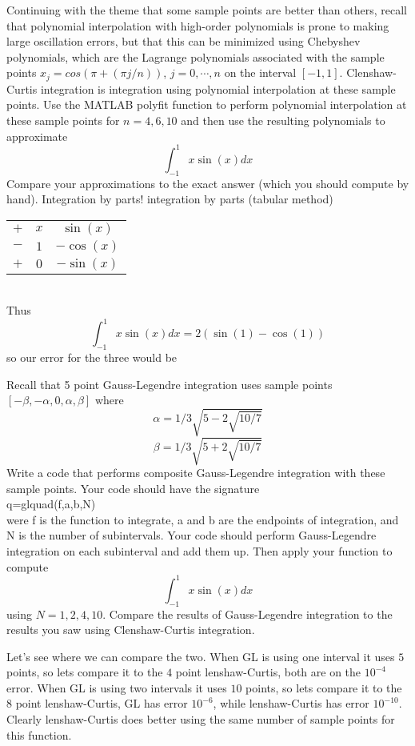 \documentclass[12pt]{article}
\makeatletter
\theoremstyle{homework}
\newenvironment{exercise}[1]
{\def\@currentlabel{#1}\exercisecore}
{\endexercisecore}
\makeatother
\begin{document}
\begin{exercise}
3
Continuing with the theme that some sample points are better than others, recall that
polynomial interpolation with high-order polynomials is prone to making large oscillation
errors, but that this can be minimized using Chebyshev polynomials, which are the
Lagrange polynomials associated with the sample points
$x_j = cos(\pi + (\pi j/n))$, $j = 0, \cdots , n$
on the interval $[-1,1]$. Clenshaw-Curtis integration is integration using polynomial interpolation
at these sample points.
Use the MATLAB polyfit function to perform polynomial interpolation at these sample
points for $n = 4, 6,10$ and then use the resulting polynomials to approximate
$$\int^1_{-1}x \sin(x) dx$$
Compare your approximations to the exact answer (which you should compute by hand).
Integration by parts!
\end{exercise}
integration by parts (tabular method)\\
\begin{tabular}{c c c}
$+$ & $x$ & $\sin(x)$\\
$-$ & $1$ & $-\cos(x)$\\
$+$ & $0$ & $-\sin(x)$\\
\end{tabular}\\
Thus
$$\int^1_{-1}x \sin(x) dx=2(\sin(1)-\cos(1))$$
so our error for the three would be


\begin{exercise}
4
Recall that 5 point Gauss-Legendre integration uses sample points$[-\beta,-\alpha,0,\alpha,\beta]$ where
$$\alpha=1/3\sqrt{5-2\sqrt{10/7}}$$
$$\beta=1/3\sqrt{5+2\sqrt{10/7}}$$
Write a code that performs composite Gauss-Legendre integration with these sample
points. Your code should have the signature\\
q=glquad(f,a,b,N)\\
were f is the function to integrate, a and b are the endpoints of integration, and N is the
number of subintervals. Your code should perform Gauss-Legendre integration on each
subinterval and add them up. Then apply your function to compute
$$\int^1_{-1}x \sin(x) dx$$
using $N = 1, 2, 4,10$. Compare the results of Gauss-Legendre integration to the results
you saw using Clenshaw-Curtis integration.
\end{exercise}



Let's see where we can compare the two.  When GL is using one interval it uses $5$ points, so lets compare it to the $4$ point lenshaw-Curtis, both are on the $10^{-4}$ error.  When GL is using two intervals it uses $10$ points, so lets compare it to the $8$ point lenshaw-Curtis, GL has error $10^{-6}$, while lenshaw-Curtis has error $10^{-10}$.  Clearly lenshaw-Curtis does better using the same number of sample points for this function.
\end{document}
